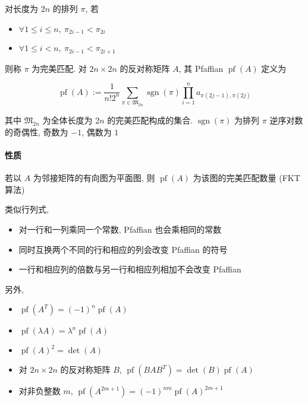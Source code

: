 对长度为 \(2n\) 的排列 \(\pi\), 若

\begin{itemize}
    \item \(\forall 1\le i\le n,~\pi_{2i-1}<\pi_{2i}\)
    \item \(\forall 1\le i< n,~\pi_{2i-1}<\pi_{2i+1}\)
\end{itemize}

则称 \(\pi\) 为完美匹配. 对 \(2n\times 2n\) 的反对称矩阵 \(A\), 其 Pfaffian \(\operatorname{pf}(A)\) 定义为

\[
    \operatorname{pf}(A):=\frac{1}{n!2^n}\sum_{\pi\in \mathfrak{M}_{2n}}\operatorname{sgn}(\pi)\prod_{i=1}^n a_{\pi(2j-1),\pi(2j)}
\]

其中 \(\mathfrak{M}_{2n}\) 为全体长度为 \(2n\) 的完美匹配构成的集合. \(\operatorname{sgn}(\pi)\) 为排列 \(\pi\) 逆序对数的奇偶性, 奇数为 \(-1\), 偶数为 \(1\)

\paragraph{性质}

若以 \(A\) 为邻接矩阵的有向图为平面图, 则 \(\operatorname{pf}(A)\) 为该图的完美匹配数量 (FKT 算法)

类似行列式, 

\begin{itemize}
    \item 对一行和一列乘同一个常数, Pfaffian 也会乘相同的常数
    \item 同时互换两个不同的行和相应的列会改变 Pfaffian 的符号
    \item 一行和相应列的倍数与另一行和相应列相加不会改变 Pfaffian
\end{itemize}

另外,

\begin{itemize}
    \item \(\operatorname{pf}\left(A^T\right)=(-1)^n\operatorname{pf}(A)\)
    \item \(\operatorname{pf}(\lambda A)=\lambda^n\operatorname{pf}(A)\)
    \item \(\operatorname{pf}(A)^2=\operatorname{det}(A)\)
    \item 对 \(2n\times 2n\) 的反对称矩阵 \(B\), \(\operatorname{pf}\left(BAB^T\right)=\operatorname{det}(B)\operatorname{pf}(A)\)
    \item 对非负整数 \(m\), \(\operatorname{pf}\left(A^{2m+1}\right)=(-1)^{nm}\operatorname{pf}(A)^{2m+1}\)
\end{itemize}

